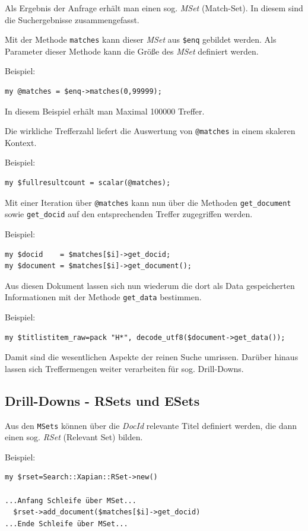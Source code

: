 \documentclass[11pt, twoside, a4paper, BCOR8mm, DIV12, bibtotoc,idxtotoc]{scrbook}
\begin{document}
Als Ergebnis der Anfrage erhält man einen sog. \emph{MSet}
(Match-Set). In diesem sind die Such\-er\-geb\-nisse zusammengefasst.

Mit der Methode \texttt{matches} kann dieser \emph{MSet} aus
\texttt{\$enq} gebildet werden. Als Parameter dieser Methode kann die Größe des
\emph{MSet} definiert werden.

Beispiel:
\begin{verbatim}
my @matches = $enq->matches(0,99999);
\end{verbatim}

In diesem Beispiel erhält man Maximal 100000 Treffer.

Die wirkliche Trefferzahl liefert die Auswertung von \texttt{@matches}
in einem skaleren Kontext.

Beispiel:
\begin{verbatim}
my $fullresultcount = scalar(@matches);
\end{verbatim}


Mit einer Iteration über \texttt{@matches} kann nun über die Methoden
\texttt{get\_document} sowie \texttt{get\_docid} auf den
entsprechenden Treffer zugegriffen werden.

Beispiel:
\begin{verbatim}
my $docid    = $matches[$i]->get_docid;
my $document = $matches[$i]->get_document();
\end{verbatim}

Aus diesen Dokument lassen sich nun wiederum die dort als Data
gespeicherten Informationen mit der Methode \texttt{get\_data} bestimmen.

Beispiel:
\begin{verbatim}
my $titlistitem_raw=pack "H*", decode_utf8($document->get_data());
\end{verbatim}

Damit sind die wesentlichen Aspekte der reinen Suche
umrissen. Darüber hinaus lassen sich Treffermengen weiter verarbeiten
für sog. Drill-Downs.


\subsection{Drill-Downs - RSets und ESets}

Aus den \texttt{MSets} können über die \emph{DocId} relevante Titel
definiert werden, die dann einen sog. \emph{RSet} (Relevant Set)
bilden.

Beispiel:
\begin{verbatim}
my $rset=Search::Xapian::RSet->new()

...Anfang Schleife über MSet...
  $rset->add_document($matches[$i]->get_docid)
...Ende Schleife über MSet...
\end{verbatim}
\end{document}
